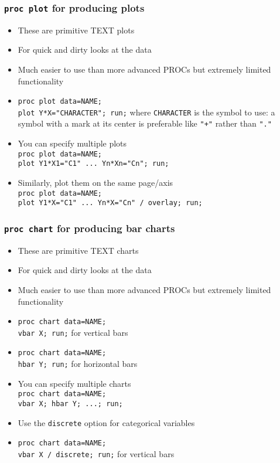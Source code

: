 \documentclass[11pt,pdftex,dvipsnames,usenames,helvetica]{beamer}
\begin{document}
\begin{frame}[fragile]
\frametitle{{\tt proc plot} for producing plots}
\begin{itemize}
\item These are primitive TEXT plots
\item For quick and dirty looks at the data
\item Much easier to use than more advanced PROCs but
extremely limited functionality
\item {\tt proc plot data=NAME;\\ \qquad plot Y*X="CHARACTER"; run;}
where {\tt CHARACTER} is the symbol to use:
a symbol with a mark at its center is preferable
like {\tt "+"} rather than {\tt "."}
\item You can specify multiple plots\\
{\tt proc plot data=NAME;\\ \qquad plot Y1*X1="C1" ...\ Yn*Xn="Cn"; run;}
\item Similarly, plot them on the same page/axis\\
{\tt proc plot data=NAME;\\ \qquad plot Y1*X="C1" ...\ Yn*X="Cn" / overlay; run;}
\end{itemize}

\end{frame}

\begin{frame}[fragile]
\frametitle{{\tt proc chart} for producing bar charts}
\begin{itemize}
\item These are primitive TEXT charts
\item For quick and dirty looks at the data
\item Much easier to use than more advanced PROCs but
extremely limited functionality
\item {\tt proc chart data=NAME;\\ \qquad vbar X; run;} for vertical bars
\item {\tt proc chart data=NAME;\\ \qquad hbar Y; run;} for horizontal bars
\item You can specify multiple charts\\
{\tt proc chart data=NAME;\\ \qquad vbar X; hbar Y; ...; run;} 
\item Use the {\tt discrete} option for categorical variables
\item {\tt proc chart data=NAME;\\ \qquad vbar X / discrete; run;} for vertical bars
\end{itemize}

\end{frame}
\end{document}
